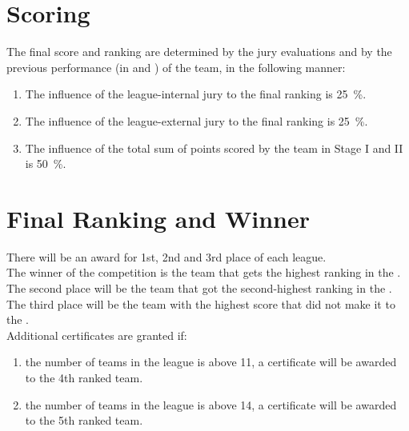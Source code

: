 \section{Scoring}
\label{sec:finals:scoring}
The final score and ranking are determined by the jury evaluations and by the previous performance (in \SONE{} and \STWO{}) of the team, in the following manner:
  
\begin{enumerate}
  \item The influence of the league-internal jury to the final ranking is \SI{25}{\percent}.
  \item The influence of the league-external jury to the final ranking is \SI{25}{\percent}.
  \item The influence of the total sum of points scored by the team in Stage I and II is \SI{50}{\percent}.
\end{enumerate}


\section{Final Ranking and Winner}
\label{sec:finals:ranking}

There will be an award for 1st, 2nd and 3rd place of each league.\\
The winner of the competition is the team that gets the highest ranking in the \FINAL{}.\\
The second place will be the team that got the second-highest ranking in the \FINAL{}.\\
The third place will be the team with the highest score that did not make it to the \FINAL{}.\\
Additional certificates are granted if:

\begin{enumerate}
  \item the number of teams in the league is above 11, a certificate will be awarded to the 4th ranked team.
  \item the number of teams in the league is above 14, a certificate will be awarded to the 5th ranked team.
\end{enumerate}


